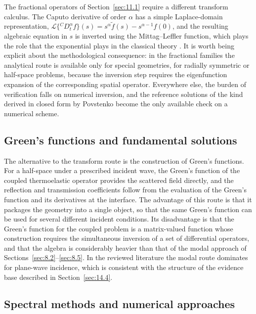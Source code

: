 The fractional operators of Section~\ref{sec:11.1} require a different transform calculus. The Caputo derivative of order $\alpha$ has a simple Laplace-domain representation, $\mathcal{L}\{{}^C D_t^\alpha f\}(s) = s^\alpha \tilde{f}(s) - s^{\alpha-1} f(0)$, and the resulting algebraic equation in $s$ is inverted using the Mittag--Leffler function, which plays the role that the exponential plays in the classical theory \cite{Gorenflo1997,Luchko2010}. It is worth being explicit about the methodological consequence: in the fractional families the analytical route is available only for special geometries, for radially symmetric or half-space problems, because the inversion step requires the eigenfunction expansion of the corresponding spatial operator. Everywhere else, the burden of verification falls on numerical inversion, and the reference solutions of the kind derived in closed form by Povstenko \cite{Povstenko2007} become the only available check on a numerical scheme.

\subsection{Green's functions and fundamental solutions}
\label{sec:8.7}

The alternative to the transform route is the construction of Green's functions. For a half-space under a prescribed incident wave, the Green's function of the coupled thermoelastic operator provides the scattered field directly, and the reflection and transmission coefficients follow from the evaluation of the Green's function and its derivatives at the interface. The advantage of this route is that it packages the geometry into a single object, so that the same Green's function can be used for several different incident conditions. Its disadvantage is that the Green's function for the coupled problem is a matrix-valued function whose construction requires the simultaneous inversion of a set of differential operators, and that the algebra is considerably heavier than that of the modal approach of Sections~\ref{sec:8.2}--\ref{sec:8.5}. In the reviewed literature the modal route dominates for plane-wave incidence, which is consistent with the structure of the evidence base described in Section~\ref{sec:14.4}.

\subsection{Spectral methods and numerical approaches}
\label{sec:8.8}

